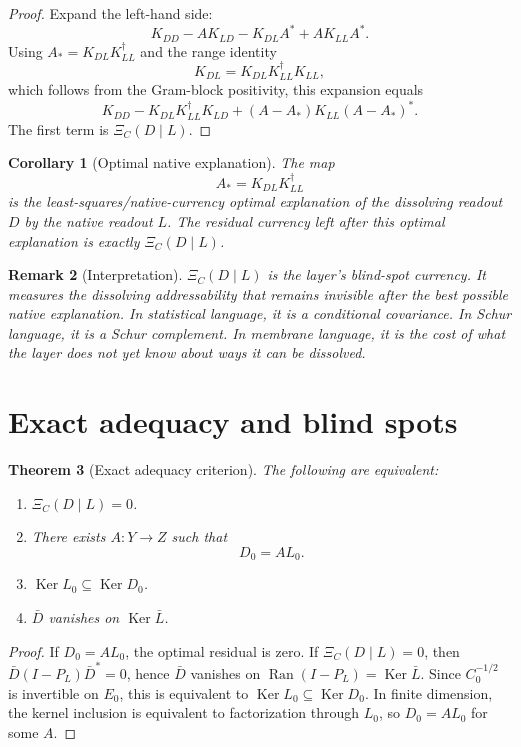 \documentclass[11pt]{article}
\newtheorem{theorem}{Theorem}[section]
\newtheorem{corollary}[theorem]{Corollary}
\newtheorem{remark}[theorem]{Remark}
\newcommand{\Ran}{\operatorname{Ran}}
\newcommand{\Ker}{\operatorname{Ker}}
\begin{document}
\begin{proof}
Expand the left-hand side:
\[
K_{DD}-AK_{LD}-K_{DL}A^*+AK_{LL}A^*.
\]
Using $A_*=K_{DL}K_{LL}^{\dagger}$ and the range identity
\[
K_{DL}=K_{DL}K_{LL}^{\dagger}K_{LL},
\]
which follows from the Gram-block positivity, this expansion equals
\[
K_{DD}-K_{DL}K_{LL}^{\dagger}K_{LD}
+(A-A_*)K_{LL}(A-A_*)^*.
\]
The first term is $\Xi_C(D\mid L)$.
\end{proof}

\begin{corollary}[Optimal native explanation]
The map
\[
A_*=K_{DL}K_{LL}^{\dagger}
\]
is the least-squares/native-currency optimal explanation of the dissolving readout $D$ by the native readout $L$.  The residual currency left after this optimal explanation is exactly $\Xi_C(D\mid L)$.
\end{corollary}

\begin{remark}[Interpretation]
$\Xi_C(D\mid L)$ is the layer's blind-spot currency.  It measures the dissolving addressability that remains invisible after the best possible native explanation.  In statistical language, it is a conditional covariance.  In Schur language, it is a Schur complement.  In membrane language, it is the cost of what the layer does not yet know about ways it can be dissolved.
\end{remark}

\section{Exact adequacy and blind spots}

\begin{theorem}[Exact adequacy criterion]
The following are equivalent:
\begin{enumerate}[label=(\roman*)]
\item $\Xi_C(D\mid L)=0$.
\item There exists $A:Y\to Z$ such that
\[
D_0=AL_0.
\]
\item $\Ker L_0\subseteq\Ker D_0$.
\item $\bar D$ vanishes on $\Ker\bar L$.
\end{enumerate}
\end{theorem}

\begin{proof}
If $D_0=AL_0$, the optimal residual is zero.  If $\Xi_C(D\mid L)=0$, then $\bar D(I-P_L)\bar D^*=0$, hence $\bar D$ vanishes on $\Ran(I-P_L)=\Ker\bar L$. Since $C_0^{-1/2}$ is invertible on $E_0$, this is equivalent to $\Ker L_0\subseteq\Ker D_0$.  In finite dimension, the kernel inclusion is equivalent to factorization through $L_0$, so $D_0=AL_0$ for some $A$.
\end{proof}
\end{document}
